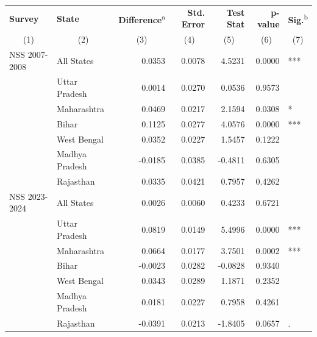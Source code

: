 
\begin{tabular}{llrrrrl}
\toprule
\textbf{Survey} & \textbf{State} & \textbf{Difference}\textsuperscript{a} & \textbf{Std. Error} & \textbf{Test Stat} & \textbf{p-value} & \textbf{Sig.}\textsuperscript{b}\\
\multicolumn{1}{c}{(1)} & \multicolumn{1}{c}{(2)} & \multicolumn{1}{c}{(3)} & \multicolumn{1}{c}{(4)} & \multicolumn{1}{c}{(5)} & \multicolumn{1}{c}{(6)} & \multicolumn{1}{c}{(7)} \\
\midrule
NSS 2007-2008 & All States & 0.0353 & 0.0078 & 4.5231 & 0.0000 & ***\\
 & Uttar Pradesh & 0.0014 & 0.0270 & 0.0536 & 0.9573 & \\
 & Maharashtra & 0.0469 & 0.0217 & 2.1594 & 0.0308 & *\\
 & Bihar & 0.1125 & 0.0277 & 4.0576 & 0.0000 & ***\\
 & West Bengal & 0.0352 & 0.0227 & 1.5457 & 0.1222 & \\
 & Madhya Pradesh & -0.0185 & 0.0385 & -0.4811 & 0.6305 & \\
 & Rajasthan & 0.0335 & 0.0421 & 0.7957 & 0.4262 & \\
\addlinespace
NSS 2023-2024 & All States & 0.0026 & 0.0060 & 0.4233 & 0.6721 & \\
 & Uttar Pradesh & 0.0819 & 0.0149 & 5.4996 & 0.0000 & ***\\
 & Maharashtra & 0.0664 & 0.0177 & 3.7501 & 0.0002 & ***\\
 & Bihar & -0.0023 & 0.0282 & -0.0828 & 0.9340 & \\
 & West Bengal & 0.0343 & 0.0289 & 1.1871 & 0.2352 & \\
 & Madhya Pradesh & 0.0181 & 0.0227 & 0.7958 & 0.4261 & \\
 & Rajasthan & -0.0391 & 0.0213 & -1.8405 & 0.0657 & .\\
\bottomrule
\end{tabular}

